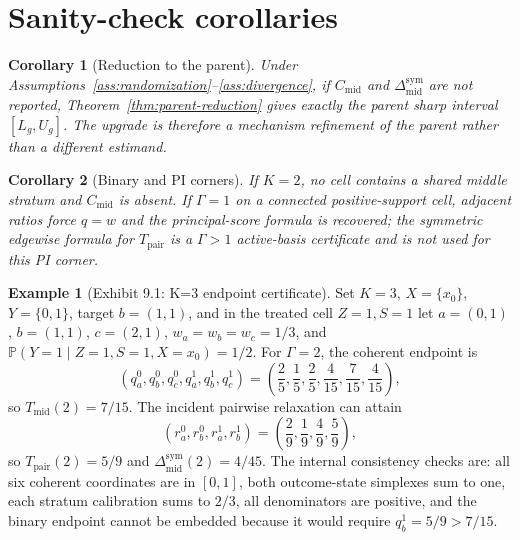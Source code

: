 \documentclass[11pt]{article}
\renewcommand{\Pr}{\mathbb{P}}
\theoremstyle{definition}
\newtheorem{example}{Example}
\theoremstyle{plain}
\newtheorem{corollary}{Corollary}
\theoremstyle{remark}
\begin{document}
\section{Sanity-check corollaries}
\begin{corollary}[Reduction to the parent]\label{cor:parent}
Under Assumptions~\ref{ass:randomization}--\ref{ass:divergence}, if \(C_{\mathrm{mid}}\) and \(\Delta_{\mathrm{mid}}^{\mathrm{sym}}\) are not reported, Theorem~\ref{thm:parent-reduction} gives exactly the parent sharp interval \([L_g,U_g]\).  The upgrade is therefore a mechanism refinement of the parent rather than a different estimand.
\end{corollary}

\begin{corollary}[Binary and PI corners]\label{cor:corners}
If \(K=2\), no cell contains a shared middle stratum and \(C_{\mathrm{mid}}\) is absent.  If \(\Gamma=1\) on a connected positive-support cell, adjacent ratios force \(q=w\) and the principal-score formula is recovered; the symmetric edgewise formula for \(T_{\mathrm{pair}}\) is a \(\Gamma>1\) active-basis certificate and is not used for this PI corner.
\end{corollary}

\begin{example}[Exhibit 9.1: K=3 endpoint certificate]\label{ex:witness}
Set \(K=3\), \(X=\{x_0\}\), \(Y=\{0,1\}\), target \(b=(1,1)\), and in the treated cell \(Z=1,S=1\) let \(a=(0,1)\), \(b=(1,1)\), \(c=(2,1)\), \(w_a=w_b=w_c=1/3\), and \(\Pr(Y=1\mid Z=1,S=1,X=x_0)=1/2\).  For \(\Gamma=2\), the coherent endpoint is
\[
  (q_a^0,q_b^0,q_c^0,q_a^1,q_b^1,q_c^1)
  =\left(\frac25,\frac15,\frac25,\frac4{15},\frac7{15},\frac4{15}\right),
\]
so \(T_{\mathrm{mid}}(2)=7/15\).  The incident pairwise relaxation can attain
\[
  (r_a^0,r_b^0,r_a^1,r_b^1)=\left(\frac29,\frac19,\frac49,\frac59\right),
\]
so \(T_{\mathrm{pair}}(2)=5/9\) and \(\Delta_{\mathrm{mid}}^{\mathrm{sym}}(2)=4/45\).  The internal consistency checks are: all six coherent coordinates are in \([0,1]\), both outcome-state simplexes sum to one, each stratum calibration sums to \(2/3\), all denominators are positive, and the binary endpoint cannot be embedded because it would require \(q_b^1=5/9>7/15\).
\end{example}
\end{document}
